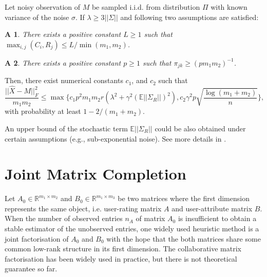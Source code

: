 \documentclass{article} %
\newtheorem{assumption}{A}
\begin{document}
\begin{theorem} 
Let noisy observation of $M$ be sampled i.i.d. from distribution $\Pi$ with known variance of the noise $\sigma$. If $\lambda \geq 3||\Sigma||$ and following two assumptions are satisfied:

\begin{assumption}
\label{assume:row_column}
There exists a positive constant $L \geq 1 $ such that
$\max_{i,j}(C_i, R_j) \leq L / \min(m_1, m_2)$.
\end{assumption}

\begin{assumption}
\label{assume:min_p}
There exists a positive constant $p \geq 1 $ such that
$\pi_{jk} \geq (p m_1 m_2)^{-1}$.
\end{assumption}

Then, there exist numerical constants $c_1$, and $c_2$ such that
\begin{equation}
\frac{||\hat{X} - M||_F^2}{m_1m_2} \leq \max\bigg\{ c_1 p^2 m_1 m_2 r (\lambda^2 + \gamma^2(\mathbb{E}||\Sigma_R||)^2), c_2\gamma^2p\sqrt{\frac{\log(m_1 + m_2)}{n}} \bigg\},
\end{equation}
with probability at least $1 - 2/(m_1 + m_2)$.
\end{theorem}

An upper bound of the stochastic term $\mathbb{E}||\Sigma_R||$ could be also obtained under certain assumptions (e.g., sub-exponential noise). See more details in \cite{klopp2014noisy}.


\section{Joint Matrix Completion}
Let $A_0 \in \mathbb{R}^{m_1 \times m_2}$ and $B_0 \in \mathbb{R}^{m_1 \times m_3}$ be two matrices where the first dimension represents the same object, i.e. user-rating matrix $A$ and user-attribute matrix $B$. When the number of observed entries $n_A$ of matrix $A_0$ is insufficient to obtain a stable estimator of the unobserved entries, one widely used heuristic method is a joint factorisation of $A_0$ and $B_0$ with the hope that the both matrices share some common low-rank structure in its first dimension. The collaborative matrix factorisation has been widely used in practice, but there is not theoretical guarantee so far.
\end{document}
